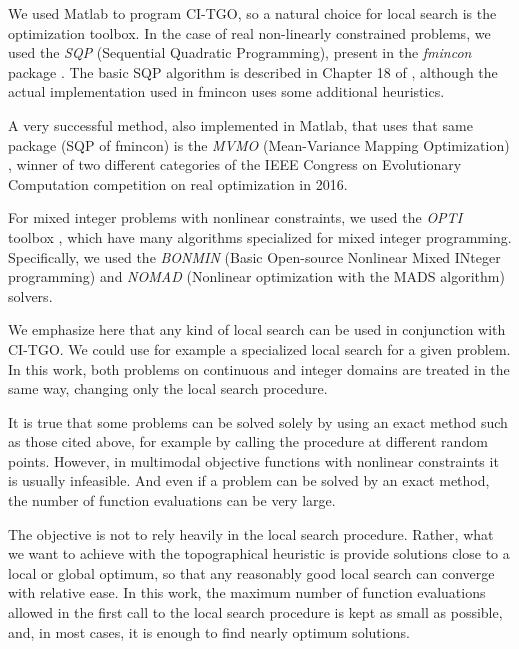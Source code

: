 We used Matlab to program CI-TGO, so a natural choice for local search is the optimization toolbox. In the case of real non-linearly constrained problems, we used the \textit{SQP} (Sequential Quadratic Programming), present in the \textit{fmincon} package \citep{fmincon}. The basic SQP algorithm is described in Chapter 18 of \cite{Nocedal}, although the actual implementation used in fmincon uses some additional heuristics. 

A very successful method, also implemented in Matlab, that uses that same package (SQP of fmincon) is the \textit{MVMO} (Mean-Variance Mapping Optimization) \citep{MVMO}, winner of two different categories of the IEEE Congress on Evolutionary Computation competition on real optimization in 2016.

For mixed integer problems with nonlinear constraints, we used the \textit{OPTI} toolbox \citep{OPTI}, which have many algorithms specialized for mixed integer programming. Specifically, we used the \textit{BONMIN} (Basic Open-source Nonlinear Mixed INteger programming) \citep{BONMIN} and \textit{NOMAD} (Nonlinear optimization with the MADS algorithm) \citep{NOMAD} solvers.

We emphasize here that any kind of local search can be used in conjunction with CI-TGO. We could use for example a specialized local search for a given problem. In this work, both problems on continuous and integer domains are treated in the same way, changing only the local search procedure.

It is true that some problems can be solved solely by using an exact method such as those cited above, for example by calling the procedure at different random points. However, in multimodal objective functions with nonlinear constraints it is usually infeasible. And even if a problem can be solved by an exact method, the number of function evaluations can be very large.

The objective is not to rely heavily in the local search procedure. Rather, what we want to achieve with the topographical heuristic is provide solutions close to a local or global optimum, so that any reasonably good local search can converge with relative ease. In this work, the maximum number of function evaluations allowed in the first call to the local search procedure is kept as small as possible, and, in most cases, it is enough to find nearly optimum solutions.

